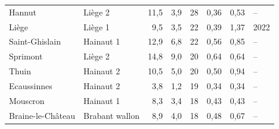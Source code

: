 \begin{tabular}{llrrrrrl}
\quad Hannut & Liège 2 & 11{,}5 & 3{,}9 & \textminus{}28 & 0{,}36 & 0{,}53 & -- \\
\quad Liège & Liège 1 & 9{,}5 & 3{,}5 & \textminus{}22 & 0{,}39 & 1{,}37 & 2022 \\
\quad Saint-Ghislain & Hainaut 1 & 12{,}9 & 6{,}8 & \textminus{}22 & 0{,}56 & 0{,}85 & -- \\
\quad Sprimont & Liège 2 & 14{,}8 & 9{,}0 & \textminus{}20 & 0{,}64 & 0{,}64 & -- \\
\quad Thuin & Hainaut 2 & 10{,}5 & 5{,}0 & \textminus{}20 & 0{,}50 & 0{,}94 & -- \\
\quad Ecaussinnes & Hainaut 2 & 3{,}8 & \textminus{}1{,}2 & \textminus{}19 & \textminus{}0{,}34 & \textminus{}0{,}34 & -- \\
\quad Mouscron & Hainaut 1 & 8{,}3 & 3{,}4 & \textminus{}18 & 0{,}43 & 0{,}43 & -- \\
\quad Braine-le-Château & Brabant wallon & 8{,}9 & 4{,}0 & \textminus{}18 & 0{,}48 & 0{,}67 & -- \\
\bottomrule
\end{tabular}
